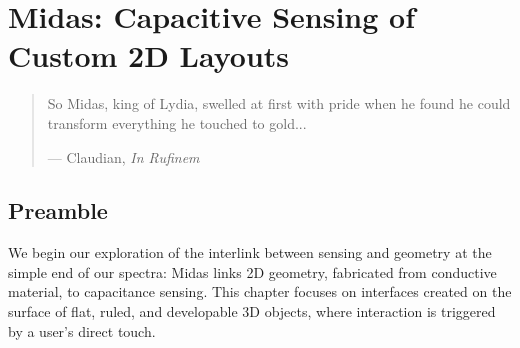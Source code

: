 \chapter{Midas: Capacitive Sensing of Custom 2D Layouts}

\begin{quote}
So Midas, king of Lydia, swelled at first with pride when he found he could transform everything he touched to gold...

--- Claudian, \emph{In Rufinem}
\end{quote}

\section{Preamble}

We begin our exploration of the interlink between sensing and geometry at the simple end of our spectra: Midas links 2D geometry, fabricated from conductive material, to capacitance sensing. This chapter focuses on interfaces created on the surface of flat, ruled, and developable 3D objects, where interaction is triggered by a user's direct touch.


